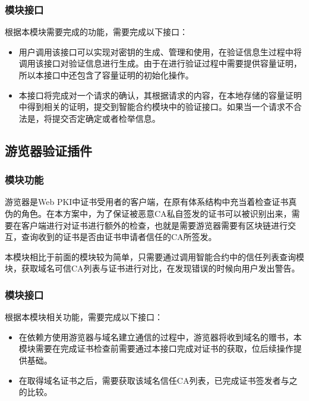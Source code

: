 \subsubsection{模块接口}

根据本模块需要完成的功能，需要完成以下接口：



\begin{itemize}
	\item 
	\noindent{}

	用户调用该接口可以实现对密钥的生成、管理和使用，在验证信息生过程中将调用该接口对验证信息进行生成。由于在进行验证过程中需要提供容量证明，所以本接口中还包含了容量证明的初始化操作。

	\item
	\noindent{}

	本接口将完成对一个请求的确认，其根据请求的内容，在本地存储的容量证明中得到相关的证明，提交到智能合约模块中的验证接口。如果当一个请求不合法是，将提交否定确定或者检举信息。
	

\end{itemize}


\subsection{游览器验证插件}

\subsubsection{模块功能}

游览器是Web PKI中证书受用者的客户端，在原有体系结构中充当着检查证书真伪的角色。在本方案中，为了保证被恶意CA私自签发的证书可以被识别出来，需要在客户端进行对证书进行额外的检查，也就是需要游览器需要有区块链进行交互，查询收到的证书是否由证书申请者信任的CA所签发。

本模块相比于前面的模块较为简单，只需要通过调用智能合约中的信任列表查询模块，获取域名可信CA列表与证书进行对比，在发现错误的时候向用户发出警告。

\subsubsection{模块接口}

根据本模块相关功能，需要完成以下接口：

\begin{itemize}
	\item 
	\noindent{}

	在依赖方使用游览器与域名建立通信的过程中，游览器将收到域名的赠书，本模块需要在完成证书检查前需要通过本接口完成对证书的获取，位后续操作提供基础。

	\item
	\noindent{}

	在取得域名证书之后，需要获取该域名信任CA列表，已完成证书签发者与之的比较。
	

\end{itemize}



